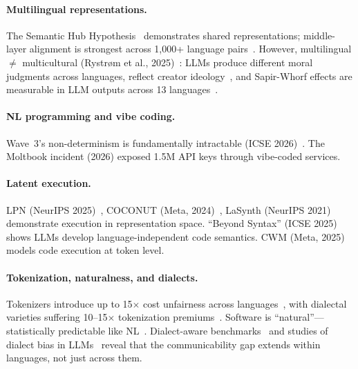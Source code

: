 \documentclass{article}
\theoremstyle{definition}
\begin{document}
\paragraph{Multilingual representations.}
The Semantic Hub Hypothesis~\citep{wu2025semantichub} demonstrates shared representations; middle-layer alignment is strongest across 1,000+ language pairs~\citep{middlelayer2025}. However, multilingual $\neq$ multicultural (Rystr{\o}m et al., 2025)~\citep{rystrom2025multicultural}: LLMs produce different moral judgments across languages, reflect creator ideology~\citep{buyl2025ideology}, and Sapir-Whorf effects are measurable in LLM outputs across 13 languages~\citep{ray2025sapirwhorf}.

\paragraph{NL programming and vibe coding.}
Wave~3's non-determinism is fundamentally intractable (ICSE 2026)~\citep{icse2026reproducibility}. The Moltbook incident (2026) exposed 1.5M API keys through vibe-coded services.

\paragraph{Latent execution.}
LPN (NeurIPS 2025)~\citep{macfarlane2025lpn}, COCONUT (Meta, 2024)~\citep{hao2024coconut}, LaSynth (NeurIPS 2021)~\citep{chen2021lasynth} demonstrate execution in representation space. ``Beyond Syntax'' (ICSE 2025)~\citep{beyondsyntax2025} shows LLMs develop language-independent code semantics. CWM (Meta, 2025)~\citep{metafair2025cwm} models code execution at token level.

\paragraph{Tokenization, naturalness, and dialects.}
Tokenizers introduce up to 15$\times$ cost unfairness across languages~\citep{petrov2024tokenizers}, with dialectal varieties suffering 10--15$\times$ tokenization premiums~\citep{tokenbiases2025}. Software is ``natural''---statistically predictable like NL~\citep{hindle2012naturalness}. Dialect-aware benchmarks~\citep{faisal2025swan} and studies of dialect bias in LLMs~\citep{bui2025dialect} reveal that the communicability gap extends within languages, not just across them.
\end{document}
